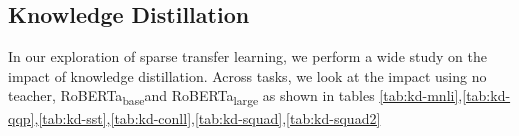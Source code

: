 \subsection{Knowledge Distillation}
\label{sec:sparse-transfer-KD}
In our exploration of sparse transfer learning, we perform a wide study on the impact of knowledge distillation. Across tasks, we look at the impact using no teacher, RoBERTa\textsubscript{base}and RoBERTa\textsubscript{large} as shown in tables \ref{tab:kd-mnli},\ref{tab:kd-qqp},\ref{tab:kd-sst},\ref{tab:kd-conll},\ref{tab:kd-squad},\ref{tab:kd-squad2}

\begin{table}[!htb]
    \centering
    \caption{Impact of knowledge distillation on the accuracy (matched) MNLI Dataset across model sizes for the various sizes of oBERTa as compared to the regularly trained baseline}
    \label{tab:kd-mnli}
\end{table}

